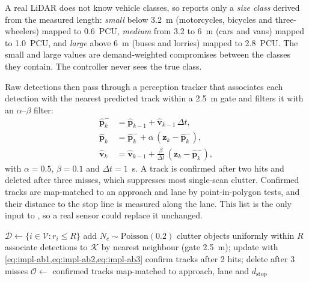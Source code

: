 A real LiDAR does not know vehicle classes, so \vls{} reports only a \emph{size class} derived from the
measured length: \emph{small} below 3.2~m (motorcycles, bicycles and three-wheelers) mapped to
0.6~PCU, \emph{medium} from 3.2 to 6~m (cars and vans) mapped to 1.0~PCU, and \emph{large} above
6~m (buses and lorries) mapped to 2.8~PCU.  The small and large values are demand-weighted compromises between the classes they contain. The controller never sees the true class.

Raw detections then pass through a perception tracker that associates each detection with the nearest
predicted track within a 2.5~m gate and filters it with an $\alpha$--$\beta$ filter:
\begin{align}
  \hat{\mathbf{p}}^{-}_{k} &= \hat{\mathbf{p}}_{k-1} + \hat{\mathbf{v}}_{k-1}\,\Delta t, \label{eq:impl-ab1}\\
  \hat{\mathbf{p}}_{k} &= \hat{\mathbf{p}}^{-}_{k} + \alpha\,(\mathbf{z}_k - \hat{\mathbf{p}}^{-}_{k}), \label{eq:impl-ab2}\\
  \hat{\mathbf{v}}_{k} &= \hat{\mathbf{v}}_{k-1} + \frac{\beta}{\Delta t}\,(\mathbf{z}_k - \hat{\mathbf{p}}^{-}_{k}), \label{eq:impl-ab3}
\end{align}
with $\alpha = 0.5$, $\beta = 0.1$ and $\Delta t = 1$~s.  A track is confirmed after two
hits and deleted after three misses, which suppresses most single-scan clutter. Confirmed tracks are
map-matched to an approach and lane by point-in-polygon tests, and their distance to the stop line is
measured along the lane.  This list is the only input to \prism{}, so a real sensor could replace it unchanged.

\begin{algorithm}[htbp]
\DontPrintSemicolon
{}
$\mathcal{D} \gets \{ i \in \mathcal{V} : r_i \leq R \}$\;
add $N_c \sim \text{Poisson}(0.2)$ clutter objects uniformly within $R$\;
associate detections to $\mathcal{K}$ by nearest neighbour (gate 2.5~m); update with \cref{eq:impl-ab1,eq:impl-ab2,eq:impl-ab3}\;
confirm tracks after 2 hits; delete after 3 misses\;
$\mathcal{O} \gets$ confirmed tracks map-matched to approach, lane and $d_{\text{stop}}$\;
\caption{\vls{} scan and perception}\label{alg:vls}
\end{algorithm}

